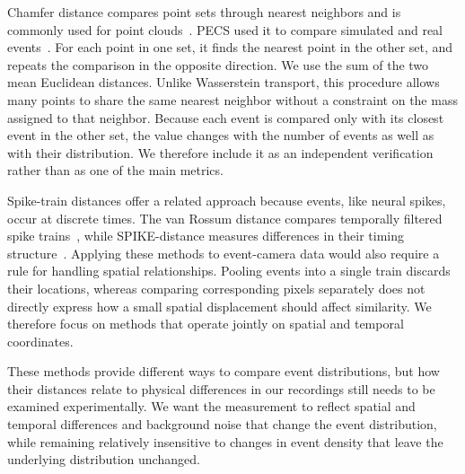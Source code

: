 Chamfer distance compares point sets through nearest neighbors and is commonly used for point clouds~\cite{fan2017pointset}. PECS used it to compare simulated and real events~\cite{han2024pecs}. For each point in one set, it finds the nearest point in the other set, and repeats the comparison in the opposite direction. We use the sum of the two mean Euclidean distances. Unlike Wasserstein transport, this procedure allows many points to share the same nearest neighbor without a constraint on the mass assigned to that neighbor. Because each event is compared only with its closest event in the other set, the value changes with the number of events as well as with their distribution. We therefore include it as an independent verification rather than as one of the main metrics.

Spike-train distances offer a related approach because events, like neural spikes, occur at discrete times. The van Rossum distance compares temporally filtered spike trains~\cite{vanrossum2001novel}, while SPIKE-distance measures differences in their timing structure~\cite{kreuz2013monitoring}. Applying these methods to event-camera data would also require a rule for handling spatial relationships. Pooling events into a single train discards their locations, whereas comparing corresponding pixels separately does not directly express how a small spatial displacement should affect similarity. We therefore focus on methods that operate jointly on spatial and temporal coordinates.

These methods provide different ways to compare event distributions, but how their distances relate to physical differences in our recordings still needs to be examined experimentally. We want the measurement to reflect spatial and temporal differences and background noise that change the event distribution, while remaining relatively insensitive to changes in event density that leave the underlying distribution unchanged.
